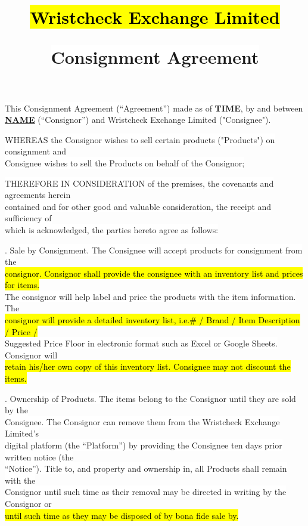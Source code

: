 \documentclass[12pt]{article}%
\title{\sethlcolor{white}\hl{Wristcheck Exchange Limited} \par \colorbox{white}{Consignment Agreement}\vspace{-3em}}%
\date{}
\begin{document}
\maketitle
\pagestyle{empty}
\thispagestyle{empty}
\setlength{\parskip}{1em} %

\begin{CJK}{UTF8}{gkai}
\noindent\colorbox{white}{ This Consignment Agreement (“Agreement”) made as of \textbf {TIME}, by and between}\\ {\colorbox{white}{{\textbf{\underline {NAME} } (“Consignor”) and Wristcheck Exchange Limited ("Consignee").}}}
\end{CJK}

\noindent \colorbox{white}{WHEREAS the Consignor wishes to sell certain products ("Products") on consignment and}\\
\colorbox{white}{Consignee wishes to sell the Products on behalf of the Consignor;}
 
\noindent \colorbox{white}{THEREFORE IN CONSIDERATION of the premises, the covenants and agreements herein}\\ 
\colorbox{white}{contained and for other good and valuable consideration, the receipt and sufficiency of}\\ 
\colorbox{white}{which is acknowledged, the parties hereto agree as follows:}
  
. \colorbox{white}{Sale by Consignment. The Consignee will accept products for consignment from the}\\ 
\hl{consignor. Consignor shall provide the consignee with an inventory list and prices for items. }\\
\colorbox{white}{The consignor will help label and price the products with the item information. The} \\
\hl{consignor will provide a detailed inventory list, i.e.\# / Brand / Item Description / Price /}\\ 
\colorbox{white}{Suggested Price Floor in electronic format such as Excel or Google Sheets. Consignor will }\\
\hl{retain his/her own copy of this inventory list. Consignee may not discount the items.}

. \colorbox{white}{Ownership of Products. The items belong to the Consignor until they are sold by the}\\ 
\colorbox{white}{Consignee. The Consignor can remove them from the Wristcheck Exchange Limited’s}\\ 
\colorbox{white}{digital platform (the “Platform”) by providing the Consignee ten days prior written notice (the }\\
\colorbox{white}{“Notice”). Title to, and property and ownership in, all Products shall remain with the}\\
\colorbox{white}{Consignor until such time as their removal may be directed in writing by the Consignor or}\\
\hl{until such time as they may be disposed of by bona fide sale by.}
\end{document}
